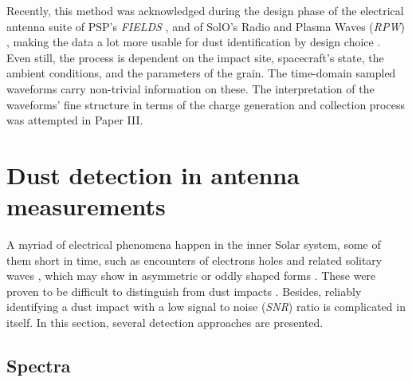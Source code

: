 Recently, this method was acknowledged during the design phase of the electrical antenna suite of PSP's \textit{FIELDS} \citep{bale2016fields}, and of SolO's Radio and Plasma Waves (\textit{RPW}) \citep{maksimovic2020solar}, making the data a lot more usable for dust identification by design choice \citep{mann2019dust}. Even still, the process is dependent on the impact site, spacecraft's state, the ambient conditions, and the parameters of the grain. The time-domain sampled waveforms carry non-trivial information on these. The interpretation of the waveforms' fine structure in terms of the charge generation and collection process was attempted in Paper III. 


\section{Dust detection in antenna measurements}

A myriad of electrical phenomena happen in the inner Solar system, some of them short in time, such as encounters of electrons holes and related solitary waves \citep{malaspina2013electrostatic,steinvall2019multispacecraft}, which may show in asymmetric or oddly shaped forms \citep{pickett2004solitary}. These were proven to be difficult to distinguish from dust impacts \citep{malaspina2016database,vaverka2018comparison}. Besides, reliably identifying a dust impact with a low signal to noise (\textit{SNR}) ratio is complicated in itself. In this section, several detection approaches are presented.

\subsection{Spectra}

